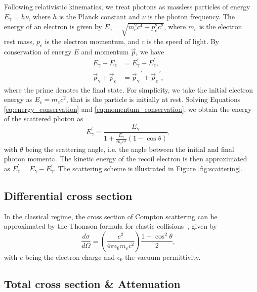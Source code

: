 \documentclass[aps,twocolumn,secnumarabic,balancelastpage,amsmath,amssymb,nofootinbib,floatfix]{revtex4-1}
\begin{document}
Following relativistic kinematics, we treat photons as massless particles of energy $E_\gamma = h \nu$, where $h$ is the Planck constant and $\nu$ is the photon frequency. The energy of an electron is given by $E_e = \sqrt{m_e^2 c^4 + p_e^2 c^2}$, where $m_e$ is the electron rest mass, $p_e$ is the electron momentum, and $c$ is the speed of light. By conservation of energy $E$ and momentum $\vec{p}$, we have
\begin{align}
    \label{eq:energy_conservation}
    E_\gamma + E_e &= E_\gamma^{\prime} + E_e^{\prime}, \\
    \label{eq:momentum_conservation}
    \vec{p}_\gamma + \vec{p}_e &= {\vec{p}_\gamma}^{\,\prime} + {\vec{p}_e}^{\,\prime},
\end{align}
where the prime denotes the final state. For simplicity, we take the initial electron energy as $E_e = m_e c^2$, that is the particle is initially at rest. Solving Equations \eqref{eq:energy_conservation} and \eqref{eq:momentum_conservation}, we obtain the energy of the scattered photon as
\begin{equation}
    \label{eq:scattered_photon_energy}
    E_\gamma^{\prime} = \frac{E_\gamma}{1 + \frac{E_\gamma}{m_e c^2} (1 - \cos \theta)},
\end{equation}
with $\theta$ being the scattering angle, i.e. the angle between the initial and final photon momenta. The kinetic energy of the recoil electron is then approximated as $E_e^{\prime} = E_\gamma - E_\gamma^{\prime}$. The scattering scheme is illustrated in Figure \ref{fig:scattering}.


\subsection{Differential cross section}
\label{ssec:differential_cross_section}

In the classical regime, the cross section of Compton scattering can be approximated by the Thomson formula for elastic collisions~\citep{Jackson1975}, given by
\begin{equation}
    \label{eq:thomson_cross_section}
    \frac{d\sigma}{d\Omega} = \left( \frac{e^2}{4 \pi \epsilon_0 m_e c^2} \right) \frac{1 + \cos^2{\theta}}{2},
\end{equation}
with $e$ being the electron charge and $\epsilon_0$ the vacuum permittivity.

\subsection{Total cross section \& Attenuation}
\label{ssec:total_cross_section}
\end{document}

